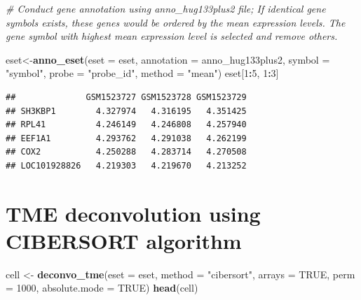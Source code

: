 \documentclass[
  12pt,
]{book}
\newenvironment{Shaded}{\begin{snugshade}}{\end{snugshade}}
\newcommand{\AttributeTok}[1]{\textcolor[rgb]{0.13,0.29,0.53}{#1}}
\newcommand{\CommentTok}[1]{\textcolor[rgb]{0.56,0.35,0.01}{\textit{#1}}}
\newcommand{\ConstantTok}[1]{\textcolor[rgb]{0.56,0.35,0.01}{#1}}
\newcommand{\DecValTok}[1]{\textcolor[rgb]{0.00,0.00,0.81}{#1}}
\newcommand{\FunctionTok}[1]{\textcolor[rgb]{0.13,0.29,0.53}{\textbf{#1}}}
\newcommand{\NormalTok}[1]{#1}
\newcommand{\OtherTok}[1]{\textcolor[rgb]{0.56,0.35,0.01}{#1}}
\newcommand{\SpecialCharTok}[1]{\textcolor[rgb]{0.81,0.36,0.00}{\textbf{#1}}}
\newcommand{\StringTok}[1]{\textcolor[rgb]{0.31,0.60,0.02}{#1}}
\begin{document}
\begin{Shaded}
\begin{Highlighting}[]
\CommentTok{\# Conduct gene annotation using \textasciigrave{}anno\_hug133plus2\textasciigrave{} file; If identical gene symbols exists, these genes would be ordered by the mean expression levels. The gene symbol with highest mean expression level is selected and remove others. }

\NormalTok{eset}\OtherTok{\textless{}{-}}\FunctionTok{anno\_eset}\NormalTok{(}\AttributeTok{eset       =}\NormalTok{ eset,}
                \AttributeTok{annotation =}\NormalTok{ anno\_hug133plus2,}
                \AttributeTok{symbol     =} \StringTok{"symbol"}\NormalTok{,}
                \AttributeTok{probe      =} \StringTok{"probe\_id"}\NormalTok{,}
                \AttributeTok{method     =} \StringTok{"mean"}\NormalTok{)}
\NormalTok{eset[}\DecValTok{1}\SpecialCharTok{:}\DecValTok{5}\NormalTok{, }\DecValTok{1}\SpecialCharTok{:}\DecValTok{3}\NormalTok{]}
\end{Highlighting}
\end{Shaded}

\begin{verbatim}
##              GSM1523727 GSM1523728 GSM1523729
## SH3KBP1        4.327974   4.316195   4.351425
## RPL41          4.246149   4.246808   4.257940
## EEF1A1         4.293762   4.291038   4.262199
## COX2           4.250288   4.283714   4.270508
## LOC101928826   4.219303   4.219670   4.213252
\end{verbatim}

\hypertarget{tme-deconvolution-using-cibersort-algorithm}{%
\section{TME deconvolution using CIBERSORT algorithm}\label{tme-deconvolution-using-cibersort-algorithm}}

\begin{Shaded}
\begin{Highlighting}[]
\NormalTok{cell }\OtherTok{\textless{}{-}} \FunctionTok{deconvo\_tme}\NormalTok{(}\AttributeTok{eset =}\NormalTok{ eset, }\AttributeTok{method =} \StringTok{"cibersort"}\NormalTok{, }\AttributeTok{arrays =} \ConstantTok{TRUE}\NormalTok{, }\AttributeTok{perm =} \DecValTok{1000}\NormalTok{, }\AttributeTok{absolute.mode =} \ConstantTok{TRUE}\NormalTok{)}
\FunctionTok{head}\NormalTok{(cell)}
\end{Highlighting}
\end{Shaded}
\end{document}
